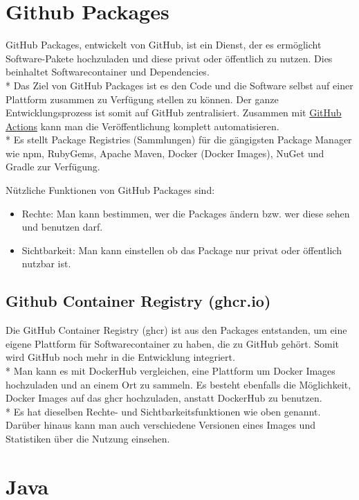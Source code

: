 \section{Github Packages}
\author{Benjamin Besic}
GitHub Packages, entwickelt von GitHub, ist ein Dienst, der es ermöglicht Software-Pakete hochzuladen und diese privat oder öffentlich zu nutzen.
Dies beinhaltet Softwarecontainer und Dependencies. \\*
Das Ziel von GitHub Packages ist es den Code und die Software selbst auf einer Plattform zusammen zu Verfügung stellen zu können.
Der ganze Entwicklungsprozess ist somit auf GitHub zentralisiert. Zusammen mit \hyperref[sec:GHAction]{GitHub Actions} kann man die Veröffentlichung
komplett automatisieren. \\*
Es stellt Package Registries (Sammlungen) für die gängigsten Package Manager wie npm, RubyGems, Apache Maven, Docker (Docker Images), 
NuGet und Gradle zur Verfügung. \cite{GHPack}

Nützliche Funktionen von GitHub Packages sind:
\begin{itemize}
    \item Rechte: Man kann bestimmen, wer die Packages ändern bzw. wer diese sehen und benutzen darf.
    \item Sichtbarkeit: Man kann einstellen ob das Package nur privat oder öffentlich nutzbar ist.
\end{itemize}

\subsection{Github Container Registry (ghcr.io)}
Die GitHub Container Registry (ghcr) ist aus den Packages entstanden, um eine eigene Plattform für Softwarecontainer zu haben, die zu GitHub gehört.
Somit wird GitHub noch mehr in die Entwicklung integriert. \\*
Man kann es mit DockerHub vergleichen, eine Plattform um Docker Images hochzuladen und an einem Ort zu sammeln. 
Es besteht ebenfalls die Möglichkeit, Docker Images auf das ghcr hochzuladen, anstatt DockerHub zu benutzen. \\*
Es hat dieselben Rechte- und Sichtbarkeitsfunktionen wie oben genannt. Darüber hinaus kann man auch verschiedene Versionen eines Images und Statistiken
über die Nutzung einsehen.\cite{GHContReg} 


\section{Java}
\author{David Ignjatovic} 

